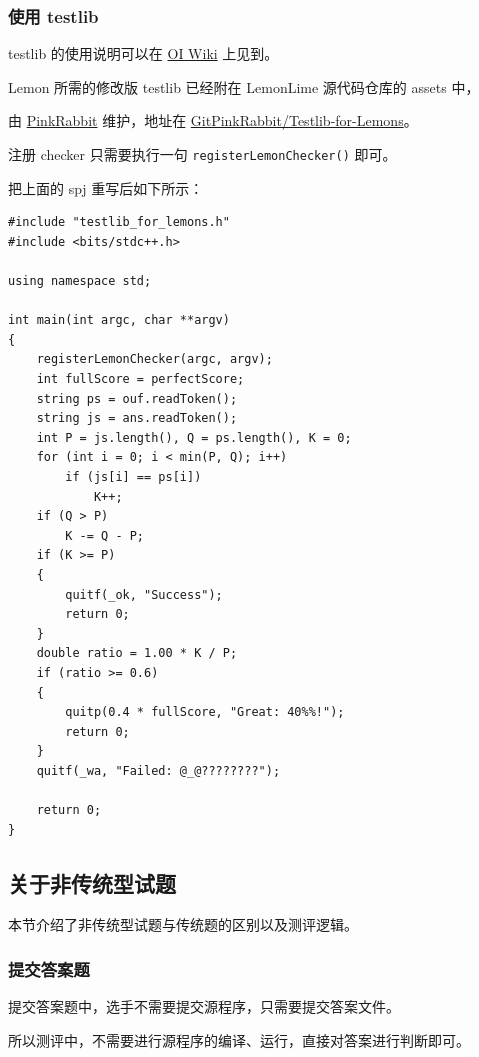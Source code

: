 \documentclass[UTF-8]{ctexart}
\begin{document}
			\subsubsection{使用 testlib}

				testlib 的使用说明可以在 \href{https://oi-wiki.org/intro/testlib/}{OI Wiki} 上见到。

				Lemon 所需的修改版 testlib 已经附在 LemonLime 源代码仓库的 assets 中，

				由 \href{https://github.com/GitPinkRabbit}{PinkRabbit} 维护，地址在 \href{https://github.com/GitPinkRabbit/Testlib-for-Lemons}{GitPinkRabbit/Testlib-for-Lemons}。

				注册 checker 只需要执行一句 \texttt{registerLemonChecker()} 即可。

				把上面的 spj 重写后如下所示：

				\begin{verbatim}
#include "testlib_for_lemons.h"
#include <bits/stdc++.h>

using namespace std;

int main(int argc, char **argv)
{
    registerLemonChecker(argc, argv);
    int fullScore = perfectScore;
    string ps = ouf.readToken();
    string js = ans.readToken();
    int P = js.length(), Q = ps.length(), K = 0;
    for (int i = 0; i < min(P, Q); i++)
        if (js[i] == ps[i])
            K++;
    if (Q > P)
        K -= Q - P;
    if (K >= P)
    {
        quitf(_ok, "Success");
        return 0;
    }
    double ratio = 1.00 * K / P;
    if (ratio >= 0.6)
    {
        quitp(0.4 * fullScore, "Great: 40%%!");
        return 0;
    }
    quitf(_wa, "Failed: @_@????????");

    return 0;
}
				\end{verbatim}


		\subsection{关于非传统型试题}

			本节介绍了非传统型试题与传统题的区别以及测评逻辑。

			\subsubsection{提交答案题}

				提交答案题中，选手不需要提交源程序，只需要提交答案文件。

				所以测评中，不需要进行源程序的编译、运行，直接对答案进行判断即可。
\end{document}

